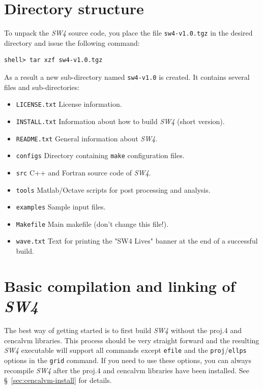 \documentclass[11pt]{report}
\begin{document}
\section{Directory structure}

To unpack the \emph{SW4} source code, you place the file \verb+sw4-v1.0.tgz+ in the
desired directory and issue the following command:
\begin{verbatim}
shell> tar xzf sw4-v1.0.tgz
\end{verbatim}
As a result a new sub-directory named \verb+sw4-v1.0+ is created. It contains several files
and sub-directories:
%
\begin{itemize}
\item \verb+LICENSE.txt+ License information.
\item \verb+INSTALL.txt+ Information about how to build \emph{SW4} (short version).
\item \verb+README.txt+ General information about \emph{SW4}.
\item \verb+configs+ Directory containing \verb+make+ configuration files.
\item \verb+src+ C++ and Fortran source code of \emph{SW4}.
\item \verb+tools+ Matlab/Octave scripts for post processing and analysis.
\item \verb+examples+ Sample input files.
\item \verb+Makefile+ Main makefile (don't change this file!).
\item \verb+wave.txt+ Text for printing the "SW4 Lives" banner at the end of a successful build.
\end{itemize}

\section{Basic compilation and linking of \emph{SW4}}\label{sec:basic-install}

The best way of getting started is to first build \emph{SW4} without the proj.4 and cencalvm
libraries. This process should be very straight forward and the resulting \emph{SW4} executable
will support all commands except \verb+efile+ and the \verb+proj+/\verb+ellps+ options in the
\verb+grid+ command. If you need to use these options, you can always recompile \emph{SW4} after the
proj.4 and cencalvm libraries have been installed. See \S~\ref{sec:cencalvm-install} for details.
\end{document}
